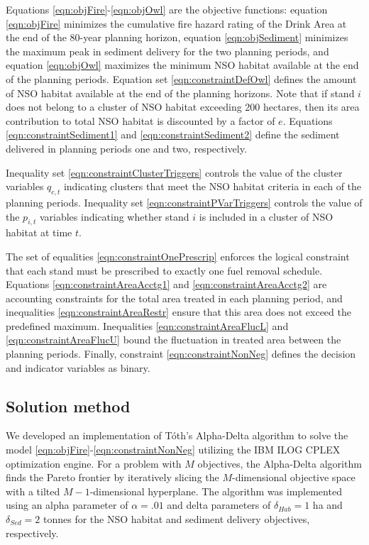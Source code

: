 Equations \eqref{eqn:objFire}-\eqref{eqn:objOwl} are the objective functions: equation \eqref{eqn:objFire} minimizes the cumulative fire hazard rating of the Drink Area at the end of the 80-year planning horizon, equation \eqref{eqn:objSediment} minimizes the maximum peak in sediment delivery for the two planning periods, and equation \eqref{eqn:objOwl} maximizes the minimum NSO habitat available at the end of the planning periods. Equation set \eqref{eqn:constraintDefOwl} defines the amount of NSO habitat available at the end of the planning horizons. Note that if stand $i$ does not belong to a cluster of NSO habitat exceeding 200 hectares, then its area contribution to total NSO habitat is discounted by a factor of $e$. Equations \eqref{eqn:constraintSediment1} and \eqref{eqn:constraintSediment2} define the sediment delivered in planning periods one and two, respectively.

Inequality set \eqref{eqn:constraintClusterTriggers} controls the value of the cluster variables $q_{c,t}$ indicating clusters that meet the NSO habitat criteria in each of the planning periods. Inequality set \eqref{eqn:constraintPVarTriggers} controls the value of the $p_{i,t}$ variables indicating whether stand $i$ is included in a cluster of NSO habitat at time $t$.

The set of equalities \eqref{eqn:constraintOnePrescrip} enforces the logical constraint that each stand must be prescribed to exactly one fuel removal schedule. Equations \eqref{eqn:constraintAreaAcctg1} and \eqref{eqn:constraintAreaAcctg2} are accounting constraints for the total area treated in each planning period, and inequalities \eqref{eqn:constraintAreaRestr} ensure that this area does not exceed the predefined maximum. Inequalities \eqref{eqn:constraintAreaFlucL} and \eqref{eqn:constraintAreaFlucU} bound the fluctuation in treated area between the planning periods. Finally, constraint \eqref{eqn:constraintNonNeg} defines the decision and indicator variables as binary.

\subsection{Solution method}
We developed an implementation of T\'{o}th's Alpha-Delta algorithm \cite{TothThesis} to solve the model \eqref{eqn:objFire}-\eqref{eqn:constraintNonNeg} utilizing the IBM ILOG CPLEX optimization engine. For a problem with $M$ objectives, the Alpha-Delta algorithm finds the Pareto frontier by iteratively slicing the $M$-dimensional objective space with a tilted $M-1$-dimensional hyperplane. The algorithm was implemented using an alpha parameter of $\alpha = .01$ and delta parameters of $\delta_{Hab} = 1$ ha and $\delta_{Sed} = 2$ tonnes for the NSO habitat and sediment delivery objectives, respectively.

